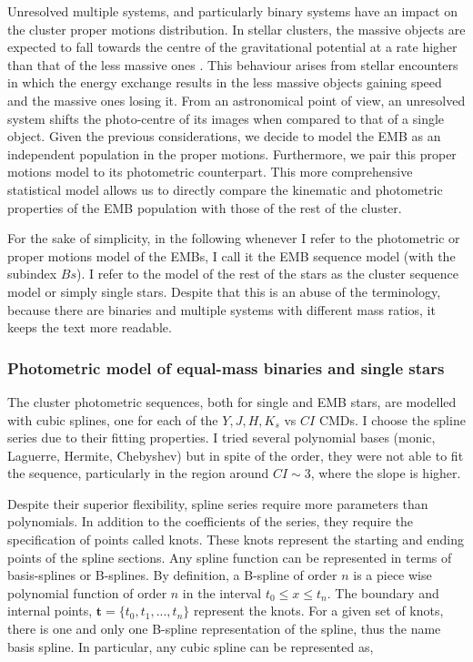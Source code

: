 Unresolved multiple systems, and particularly binary systems have an impact on the cluster proper motions distribution. In stellar clusters, the massive objects are expected to fall towards the centre of the gravitational potential at a rate higher than that of the less massive ones \citep{Binney?}. This behaviour arises from stellar encounters in which the energy exchange results in the less massive objects gaining speed and the massive ones losing it. From an astronomical point of view, an unresolved system shifts the photo-centre of its images when compared to that of a single object. Given the previous considerations, we decide to model the EMB as an independent population in the proper motions. Furthermore, we pair this proper motions model to its photometric counterpart. This more comprehensive statistical model allows us to directly compare the kinematic and photometric properties of the EMB population with those of the rest of the cluster. 

For the sake of simplicity, in the following whenever I refer to the photometric or proper motions model of the EMBs, I call it the EMB sequence model (with the subindex $Bs$). I refer to the model of the rest of the stars as the cluster sequence model or simply single stars. Despite that this is an abuse of the terminology, because there are binaries and multiple systems with different mass ratios, it keeps the text more readable.

\subsubsection{Photometric model of equal-mass binaries and single stars}

The cluster photometric sequences, both for single and EMB stars, are modelled with cubic splines, one for each of the $Y,J,H,K_s$ vs $CI$ CMDs. I choose the spline series due to their fitting properties. I tried several polynomial bases (monic, Laguerre, Hermite, Chebyshev) but in spite of the order, they were not able to fit the sequence, particularly in the region around $CI \sim 3$, where the slope is higher. 

{\color{blue}
Despite their superior flexibility, spline series require more parameters than polynomials. In addition to the coefficients of the series, they require the specification of points called knots. These knots represent the starting and ending points of the spline sections. 
}
Any spline function can be represented in terms of basis-splines or B-splines. By definition, a B-spline of order $n$ is a piece wise polynomial function of order $n$ in the interval $t_0 \leq x \leq t_n$. The boundary and internal points, $\mathbf{t}=\{t_0,t_1,...,t_n\}$ represent the knots. For a given set of knots, there is one and only one B-spline representation of the spline, thus the name basis spline.  In particular, any cubic spline can be represented as,

